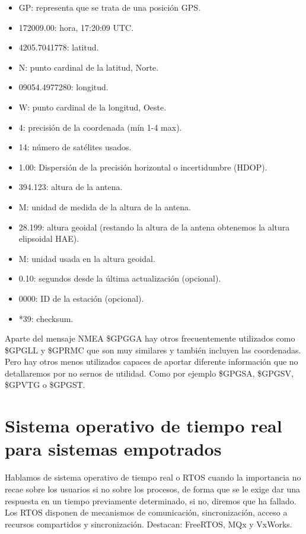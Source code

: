 \begin{itemize}
\tightlist
\item
    GP: representa que se trata de una posición GPS.
\item
    172009.00: hora, 17:20:09 UTC.
\item
    4205.7041778: latitud.
\item
    N: punto cardinal de la latitud, Norte.
\item
	09054.4977280: longitud.
\item
	W: punto cardinal de la longitud, Oeste. 
\item
	4: precisión de la coordenada (mín 1-4 max).
\item
	14: número de satélites usados.
\item
	1.00: Dispersión de la precisión horizontal o incertidumbre (HDOP).
\item
	394.123: altura de la antena.
\item
	M: unidad de medida de la altura de la antena.
\item
	28.199: altura geoidal (restando la altura de la antena obtenemos la altura elipsoidal HAE).
\item
	M: unidad usada en la altura geoidal.
\item
	0.10: segundos desde la última actualización (opcional).
\item
	0000: ID de la estación (opcional).
\item
	*39: checksum.
\end{itemize}

Aparte del mensaje NMEA \$GPGGA hay otros frecuentemente utilizados como \$GPGLL y \$GPRMC que son muy similares y también incluyen las coordenadas. Pero hay otros menos utilizados capaces de aportar diferente información que no detallaremos por no sernos de utilidad. Como por ejemplo \$GPGSA, \$GPGSV, \$GPVTG o \$GPGST.

\section{Sistema operativo de tiempo real para sistemas empotrados}
Hablamos de sistema operativo de tiempo real \cite{tiemporeal} o RTOS cuando la importancia no recae sobre los usuarios si no sobre los procesos, de forma que se le exige dar una respuesta en un tiempo previamente determinado, si no, diremos que ha fallado. Los RTOS disponen de mecanismos de comunicación, sincronización, acceso a recursos compartidos y sincronización. Destacan: FreeRTOS, MQx y VxWorks.

